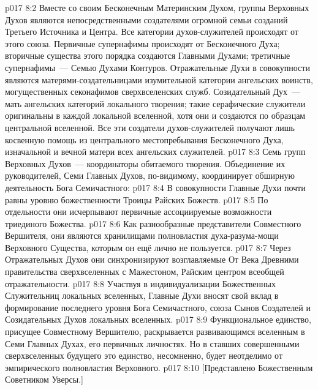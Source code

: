 \vs p017 8:2 \pc Вместе со своим Бесконечным Материнским Духом, группы Верховных Духов являются непосредственными создателями огромной семьи созданий Третьего Источника и Центра. Все категории духов\hyp{}служителей происходят от этого союза. Первичные супернафимы происходят от Бесконечного Духа; вторичные существа этого порядка создаются Главными Духами; третичные супернафимы~--- Семью Духами Контуров. Отражательные Духи в совокупности являются матерями\hyp{}создательницами изумительной категории ангельских воинств, могущественных секонафимов сверхвселенских служб. Созидательный Дух~--- мать ангельских категорий локального творения; такие серафические служители оригинальны в каждой локальной вселенной, хотя они и создаются по образцам центральной вселенной. Все эти создатели духов\hyp{}служителей получают лишь косвенную помощь из центрального местопребывания Бесконечного Духа, изначальной и вечной матери всех ангельских служителей.
\vs p017 8:3 \pc Семь групп Верховных Духов~--- координаторы обитаемого творения. Объединение их руководителей, Семи Главных Духов, по\hyp{}видимому, координирует обширную деятельность Бога Семичастного:
\vs p017 8:4 В совокупности Главные Духи почти равны уровню божественности Троицы Райских Божеств.
\vs p017 8:5 По отдельности они исчерпывают первичные ассоциируемые возможности триединого Божества.
\vs p017 8:6 Как разнообразные представители Совместного Вершителя, они являются хранилищами полновластия духа\hyp{}разума\hyp{}мощи Верховного Существа, которым он ещё лично не пользуется.
\vs p017 8:7 Через Отражательных Духов они синхронизируют возглавляемые От Века Древними правительства сверхвселенных с Мажестоном, Райским центром всеобщей отражательности.
\vs p017 8:8 Участвуя в индивидуализации Божественных Служительниц локальных вселенных, Главные Духи вносят свой вклад в формирование последнего уровня Бога Семичастного, союза Сынов Создателей и Созидательных Духов локальных вселенных.
\vs p017 8:9 \pc Функциональное единство, присущее Совместному Вершителю, раскрывается развивающимся вселенным в Семи Главных Духах, его первичных личностях. Но в ставших совершенными сверхвселенных будущего это единство, несомненно, будет неотделимо от эмпирического полновластия Верховного.
\vsetoff
\vs p017 8:10 [Представлено Божественным Советником Уверсы.]
\quizlink
